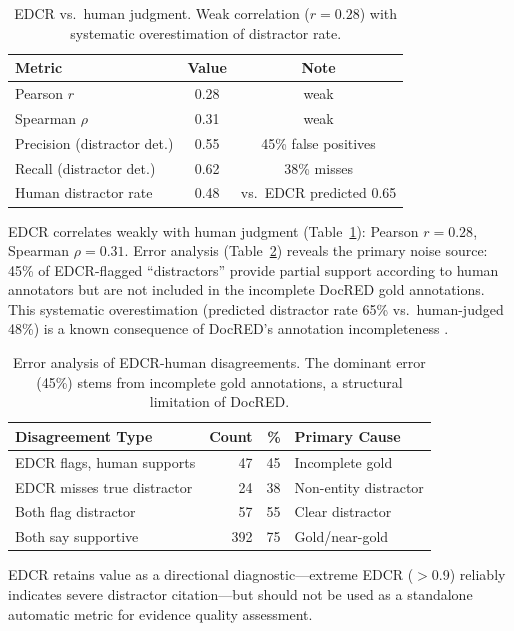 \documentclass[11pt,a4paper]{article}
\newcommand{\edcr}{\textsc{EDCR}}
\begin{document}
\begin{table}[t]
\centering
\small
\begin{tabular}{lcc}
\toprule
\textbf{Metric} & \textbf{Value} & \textbf{Note} \\
\midrule
Pearson $r$ & 0.28 & weak \\
Spearman $\rho$ & 0.31 & weak \\
Precision (distractor det.) & 0.55 & 45\% false positives \\
Recall (distractor det.) & 0.62 & 38\% misses \\
Human distractor rate & 0.48 & vs.\ \edcr{} predicted 0.65 \\
\bottomrule
\end{tabular}
\caption{\edcr{} vs.\ human judgment. Weak correlation ($r{=}0.28$) with systematic overestimation of distractor rate.}
\label{tab:edcr_human}
\end{table}

\edcr{} correlates weakly with human judgment (Table~\ref{tab:edcr_human}): Pearson $r{=}0.28$, Spearman $\rho{=}0.31$. Error analysis (Table~\ref{tab:edcr_errors}) reveals the primary noise source: 45\% of \edcr{}-flagged ``distractors'' provide partial support according to human annotators but are not included in the incomplete DocRED gold annotations. This systematic overestimation (predicted distractor rate 65\% vs.\ human-judged 48\%) is a known consequence of DocRED's annotation incompleteness \cite{tan2022revisiting}.

\begin{table}[t]
\centering
\small
\begin{tabular}{lrrl}
\toprule
\textbf{Disagreement Type} & \textbf{Count} & \textbf{\%} & \textbf{Primary Cause} \\
\midrule
\edcr{} flags, human supports & 47 & 45 & Incomplete gold \\
\edcr{} misses true distractor & 24 & 38 & Non-entity distractor \\
Both flag distractor & 57 & 55 & Clear distractor \\
Both say supportive & 392 & 75 & Gold/near-gold \\
\bottomrule
\end{tabular}
\caption{Error analysis of \edcr{}-human disagreements. The dominant error (45\%) stems from incomplete gold annotations, a structural limitation of DocRED.}
\label{tab:edcr_errors}
\end{table}

\edcr{} retains value as a directional diagnostic---extreme \edcr{} ($>$0.9) reliably indicates severe distractor citation---but should not be used as a standalone automatic metric for evidence quality assessment.
\end{document}
